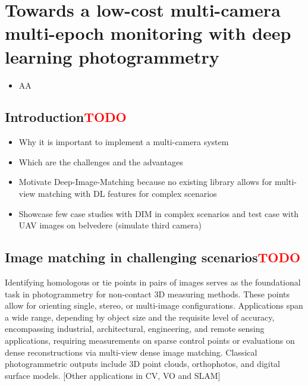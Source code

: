 \graphicspath{{figures/chapter5/}}
\onehalfspacing

\chapter{Towards a low-cost multi-camera multi-epoch monitoring with deep learning photogrammetry}\label{ch:5}

\vfill


\begin{itemize}
  \item AA
\end{itemize}

\newpage

\section{Introduction\textcolor{red}{TODO}}
{\color{red}
\begin{itemize}
    \item Why it is important to implement a multi-camera system
    \item Which are the challenges and the advantages
    \item Motivate Deep-Image-Matching because no existing library allows for multi-view matching with DL features for complex scenarios
    \item Showcase few case studies with DIM in complex scenarios and test case with UAV images on belvedere (simulate third camera)
\end{itemize}
}

\section{Image matching in challenging scenarios\textcolor{red}{TODO}}

Identifying homologous or tie points in pairs of images serves as the foundational task in photogrammetry for non-contact 3D measuring methods. These points allow for orienting single, stereo, or multi-image configurations. Applications span a wide range, depending by object size and the requisite level of accuracy, encompassing industrial, architectural, engineering, and remote sensing applications, requiring measurements on sparse control points or evaluations on dense reconstructions via multi-view dense image matching. Classical photogrammetric outputs include 3D point clouds, orthophotos, and digital surface models. [Other applications in CV, VO and SLAM] 

